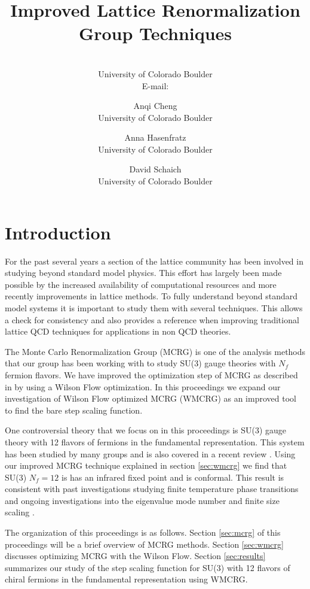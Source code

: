 \documentclass{PoS}
\title{Improved Lattice Renormalization Group Techniques}
\author{\speaker{Gregory Petropoulos}\\
        University of Colorado Boulder\\
        E-mail: \email{gregory.petropoulos@colorado.edu}}
\author{Anqi Cheng\\
        University of Colorado Boulder}
\author{Anna Hasenfratz\\
        University of Colorado Boulder}
\author{David Schaich\\
        University of Colorado Boulder}
\begin{document}
\section{Introduction}
For the past several years a section of the lattice community has been involved in studying beyond standard model physics.  
This effort has largely been made possible by the increased availability of computational resources and more recently improvements in lattice methods.
To fully understand beyond standard model systems it is important to study them with several techniques.
This allows a check for consistency and also provides a reference when improving traditional lattice QCD techniques for applications in non QCD theories.

The Monte Carlo Renormalization Group (MCRG) is one of the analysis methods that our group has been working with to study SU(3) gauge theories with $N_f$ fermion flavors.
We have improved the optimization step of MCRG as described in \cite{Petropoulos:2012Lat12} by using a Wilson Flow optimization.
In this proceedings we expand our investigation of Wilson Flow optimized MCRG (WMCRG) as an improved tool to find the bare step scaling function.

One controversial theory that we focus on in this proceedings is SU(3) gauge theory with 12 flavors of fermions in the fundamental representation.
This system has been studied by many groups \cite{Appelquist:2009ty, Deuzeman:2009mh, Hasenfratz:2011xn, Fodor:2011tu, DeGrand:2011cu, Cheng:2011ic, Cheng:2013eu, Fodor:2012uw, Fodor:2012et, Appelquist:2011dp, Aoki:2012eq, Aoki:2013pca, Itou:2012qn, Lin:2012iw, Jin:2012dw} and is also covered in a recent review \cite{Giedt:2012LAT}.
Using our improved MCRG technique explained in section \ref{sec:wmcrg} we find that SU(3) $N_f=12$ is has an infrared fixed point and is conformal.
This result is consistent with past investigations studying finite temperature phase transitions \cite{Schaich:2012fr} and ongoing investigations into the eigenvalue mode number \cite{} and finite size scaling \cite{Hasenfratz:2013eka}.

The organization of this proceedings is as follows.
Section \ref{sec:mcrg} of this proceedings will be a brief overview of MCRG methods.  
Section \ref{sec:wmcrg} discusses optimizing MCRG with the Wilson Flow.  
Section \ref{sec:results} summarizes our study of the step scaling function for SU(3) with 12 flavors of chiral fermions in the fundamental representation using WMCRG.
\end{document}
